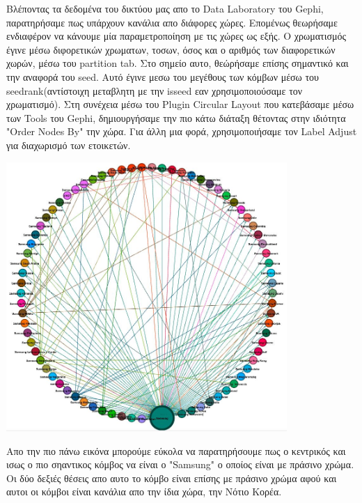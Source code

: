 \documentclass[12pt]{article}
\begin{document}
	Βλέποντας τα δεδομένα του δικτύου μας απο το Data Laboratory του Gephi, παρατηρήσαμε πως υπάρχουν κανάλια απο διάφορες χώρες. Επομένως θεωρήσαμε ενδιαφέρον να κάνουμε μία παραμετροποίηση με τις χώρες ως εξής. Ο χρωματισμός έγινε μέσω διφορετικών χρωματων, τοσων, όσος και ο αριθμός των διαφορετικών χωρών, μέσω του partition tab. Στο σημείο αυτο, θεώρήσαμε επίσης σημαντικό και την αναφορά του seed. Αυτό έγινε μεσω του μεγέθους των κόμβων μέσω του seedrank(αντίστοιχη μεταβλητη με την isseed εαν χρησιμοποιούσαμε τον χρωματισμό). Στη συνέχεια μέσω του Plugin Circular Layout που κατεβάσαμε μέσω των Tools του Gephi, δημιουργήσαμε την πιο κάτω διάταξη θέτοντας στην ιδιότητα "Order Nodes By" την χώρα. Για άλλη μια φορά, χρησιμοποιήσαμε τον Label Adjust για διαχωρισμό των ετοικετών.
		\begin{center}
			\includegraphics[width=0.8\textwidth]{photos-files/section3/third_painting.jpg}
		\end{center}
	Απο την πιο πάνω εικόνα μπορούμε εύκολα να παρατηρήσουμε πως ο κεντρικός και ισως ο πιο σηαντικος κόμβος να είναι ο "Samsung" ο οποίος είναι με πράσινο χρώμα. Οι δύο δεξιές θέσεις απο αυτο το κόμβο είναι επίσης με πράσινο χρώμα αφού και αυτοι οι κόμβοι είναι κανάλια απο την ίδια χώρα, την Νότιο Κορέα.
	\label{chap:graphical_representation_3}
	
	
\end{document}
